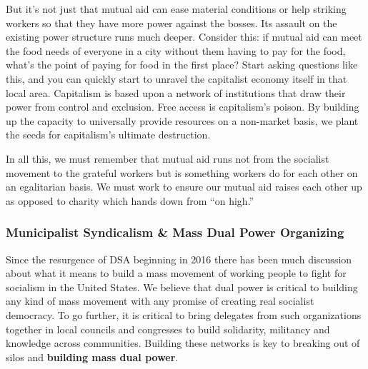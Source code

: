 \documentclass[10pt]{memoir}
\begin{document}
But it's not just that mutual aid can ease material conditions or help
striking workers so that they have more power against the bosses. Its
assault on the existing power structure runs much deeper. Consider this:
if mutual aid can meet the food needs of everyone in a city without them
having to pay for the food, what's the point of paying for food in the
first place? Start asking questions like this, and you can quickly start
to unravel the capitalist economy itself in that local area. Capitalism
is based upon a network of institutions that draw their power from
control and exclusion. Free access is capitalism's poison. By building
up the capacity to universally provide resources on a non-market basis,
we plant the seeds for capitalism's ultimate destruction.

In all this, we must remember that mutual aid runs not from the
socialist movement to the grateful workers but is something workers do
for each other on an egalitarian basis. We must work to ensure our
mutual aid raises each other up as opposed to charity which hands down
from ``on high.''

\subsubsection{Municipalist Syndicalism \& Mass Dual Power
Organizing}\label{municipalist-syndicalism-mass-dual-power-organizing}

Since the resurgence of DSA beginning in 2016 there has been much
discussion about what it means to build a mass movement of working
people to fight for socialism in the United States. We believe that dual
power is critical to building any kind of mass movement with any promise
of creating real socialist democracy. To go further, it is critical to
bring delegates from such organizations together in local councils and
congresses to build solidarity, militancy and knowledge across
communities. Building these networks is key to breaking out of silos and
\textbf{building mass dual power}.
\end{document}
